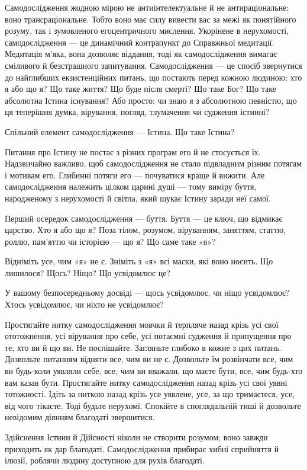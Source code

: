 Самодослідження жодною мірою не антиінтелектуальне й не антираціональне; воно трансраціональне. Тобто воно має силу вивести вас за межі як понятійного розуму, так і зумовленого егоцентричного мислення. Укорінене в нерухомості, самодослідження — це динамічний контрапункт до Справжньої медитації. Медитація м'яка, вона дозволяє віддання, тоді як самодослідження вимагає сміливого й безстрашного запитування. Самодослідження — це спосіб звернутися до найглибших екзистенційних питань, що постають перед кожною людиною: хто я або що я? Що таке життя? Що буде після смерті? Що таке Бог? Що таке абсолютна Істина існування? Або просто: чи знаю я з абсолютною певністю, що ця теперішня думка, вірування, погляд, тлумачення чи судження істинні?

Спільний елемент самодослідження — Істина. Що таке Істина?

Питання про Істину не постає з різних програм его й не стосується їх. Надзвичайно важливо, щоб самодослідження не стало підвладним різним потягам і мотивам его. Глибинні потяги его — почуватися краще й вижити. Але самодослідження належить цілком царині душі — тому виміру буття, народженому з нерухомості й світла, який шукає Істину заради неї самої.

Перший осередок самодослідження — буття. Буття — це ключ, що відмикає царство. Хто я або що я? Поза тілом, розумом, віруванням, заняттям, статтю, роллю, пам'яттю чи історією — що я? Що саме таке «я»?

Відніміть усе, чим «я» не є. Зніміть з «я» всі маски, які воно носить. Що лишилося? Щось? Ніщо? Що усвідомлює це?

У вашому безпосередньому досвіді — щось усвідомлює, чи ніщо усвідомлює? Хтось усвідомлює, чи ніхто не усвідомлює?

Простягайте нитку самодослідження мовчки й терпляче назад крізь усі свої ототожнення, усі вірування про себе, усі потаємні судження й припущення про те, хто ви й що ви. Не поспішайте. Загляньте глибоко в кожне з цих питань. Дозвольте питанням відняти все, чим ви не є. Дозвольте їм розвінчати все, чим ви будь-коли уявляли себе, все, чим ви вважали, що маєте бути, все, чим будь-хто вам казав бути. Простягайте нитку самодослідження назад крізь усі свої уявні тотожності. Ідіть за ниткою назад крізь усе уявлене, усе, за що тримаєтеся, усе, від чого тікаєте. Тоді будьте нерухомі. Спокійте в споглядальній тиші й дозвольте невідомим діянням благодаті звершитися.

Здійснення Істини й Дійсності ніколи не створити розумом; воно завжди приходить як дар благодаті. Самодослідження прибирає хибні сприйняття й ілюзії, роблячи людину доступною для рухів благодаті.

